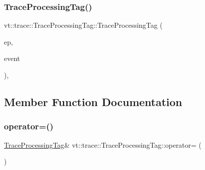 \mbox{\label{structvt_1_1trace_1_1_trace_processing_tag_af0798e165b92f31ff0b84e7f063162ea}} 
\subsubsection{\texorpdfstring{Trace\+Processing\+Tag()}{TraceProcessingTag()}\hspace{0.1cm}{\footnotesize\ttfamily [3/3]}}
{\footnotesize\ttfamily vt\+::trace\+::\+Trace\+Processing\+Tag\+::\+Trace\+Processing\+Tag (\begin{DoxyParamCaption}\item[{\hyperlink{namespacevt_1_1trace_a3c14050715ba9eceaeff51fb3de64f2f}{Trace\+Entry\+I\+D\+Type}}]{ep,  }\item[{\hyperlink{namespacevt_1_1trace_a64a7185f3e102df8d8258f263ccd1582}{Trace\+Event\+I\+D\+Type}}]{event }\end{DoxyParamCaption})\hspace{0.3cm}{\ttfamily [inline]}, {\ttfamily [private]}}



\subsection{Member Function Documentation}
\mbox{\label{structvt_1_1trace_1_1_trace_processing_tag_a56727ddff7dce03576f3ed117235b327}} 
\subsubsection{\texorpdfstring{operator=()}{operator=()}}
{\footnotesize\ttfamily \hyperlink{structvt_1_1trace_1_1_trace_processing_tag}{Trace\+Processing\+Tag}\& vt\+::trace\+::\+Trace\+Processing\+Tag\+::operator= (\begin{DoxyParamCaption}\item[{\hyperlink{structvt_1_1trace_1_1_trace_processing_tag}{Trace\+Processing\+Tag} const \&}]{ }\end{DoxyParamCaption})\hspace{0.3cm}{\ttfamily [default]}}



